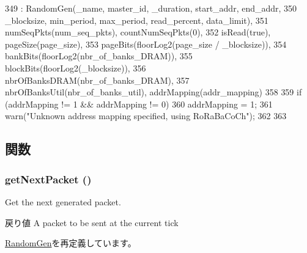 \begin{DoxyCode}
349         : RandomGen(_name, master_id, _duration, start_addr, end_addr,
350           _blocksize, min_period, max_period, read_percent, data_limit),
351           numSeqPkts(num_seq_pkts), countNumSeqPkts(0),
352           isRead(true), pageSize(page_size),
353           pageBits(floorLog2(page_size / _blocksize)),
354           bankBits(floorLog2(nbr_of_banks_DRAM)),
355           blockBits(floorLog2(_blocksize)),
356           nbrOfBanksDRAM(nbr_of_banks_DRAM),
357           nbrOfBanksUtil(nbr_of_banks_util), addrMapping(addr_mapping)
358     {
359         if (addrMapping != 1 && addrMapping != 0) {
360             addrMapping = 1;
361             warn("Unknown address mapping specified, using RoRaBaCoCh\n");
362         }
363     }
\end{DoxyCode}


\subsection{関数}
\hypertarget{classDramGen_a938aa9841a9a62a776afbd0768af5379}{
\subsubsection[{getNextPacket}]{ getNextPacket ()}}
\label{classDramGen_a938aa9841a9a62a776afbd0768af5379}
Get the next generated packet.

\begin{DoxyReturn}{戻り値}
A packet to be sent at the current tick 
\end{DoxyReturn}


\hyperlink{classRandomGen_a938aa9841a9a62a776afbd0768af5379}{RandomGen}を再定義しています。


